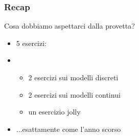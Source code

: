 \documentclass{beamer}
\date[26/05/2022]{26 maggio 2022}
\begin{document}
\frame{\titlepage}

\begin{frame}
	\frametitle{Recap}
	Cosa dobbiamo aspettarci dalla provetta?

	\begin{itemize}
		\item 5 esercizi:
		\item \begin{itemize}
			      \item 2 esercizi sui modelli discreti
			      \item 2 esercizi sui modelli continui
			      \item un esercizio jolly
		      \end{itemize}
		\item ...esattamente come l'anno scorso
	\end{itemize}
\end{frame}
\end{document}
